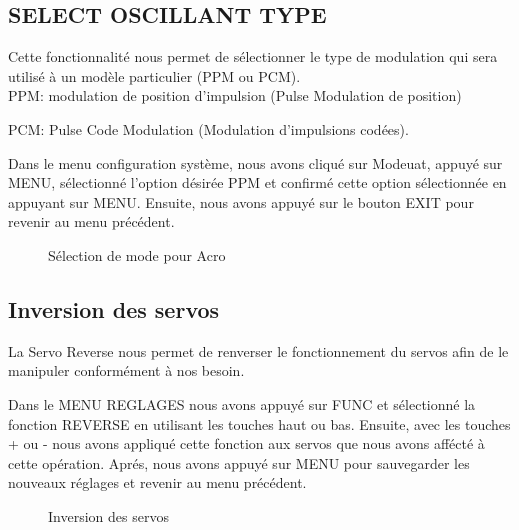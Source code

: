 	\subsection{ SELECT OSCILLANT TYPE}
	Cette fonctionnalité nous permet de sélectionner le type de modulation qui sera utilisé à un modèle particulier (PPM ou PCM).\\
	
	
	PPM: modulation de position d'impulsion (Pulse Modulation de position) 
	
	PCM: Pulse Code Modulation (Modulation d'impulsions codées).
	
	
	Dans le menu configuration système, nous avons cliqué sur Modeuat, appuyé sur MENU, sélectionné l'option désirée PPM et confirmé cette option sélectionnée en appuyant sur MENU. Ensuite, nous avons appuyé sur le bouton EXIT pour revenir au menu précédent.
	
	\begin{figure}[h]
		\begin{center}
			\centering
		\end{center}
		\caption{Sélection de mode pour Acro}
	\end{figure}
	
	\subsection{Inversion des servos}
	La Servo Reverse nous permet de renverser le fonctionnement du servos afin de le manipuler conformément à nos besoin.
	
	
	
	Dans le MENU REGLAGES nous avons appuyé sur FUNC et sélectionné la fonction REVERSE en utilisant les touches haut ou bas. Ensuite, avec les touches + ou -
	nous avons appliqué cette fonction aux servos que nous avons affécté à cette opération. Aprés, nous avons appuyé sur MENU pour sauvegarder les nouveaux réglages et revenir au menu précédent.
	\begin{figure}[h]
		\begin{center}
			\centering
		\end{center}
		\caption{Inversion des servos}
	\end{figure}
